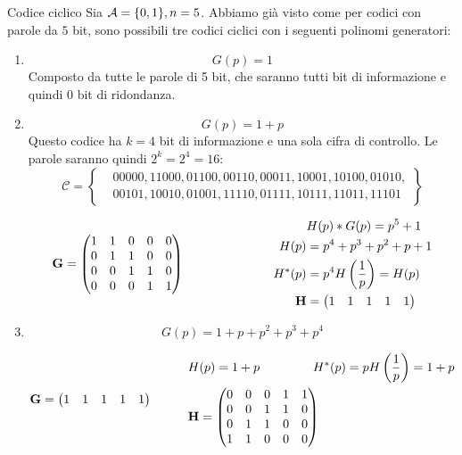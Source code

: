 \begin{esempio}{Codice ciclico}
    Sia $\mathcal{A}= \{0,1\}, \space n=5$. Abbiamo già visto come per codici con parole da $5$ bit, sono possibili tre codici ciclici con i seguenti polinomi generatori:
    \begin{enumerate}
        \item $$G(p)= 1$$
        Composto da tutte le parole di 5 bit, che saranno tutti bit di informazione e quindi $0$ bit di ridondanza.
        \item $$G(p)= 1 + p$$
        Questo codice ha $k=4$ bit di informazione e una sola cifra di controllo. Le parole saranno quindi $2^k=2^4=16$:
\[
\mathcal{C} = \left\{
\begin{aligned}
    &00000, 11000, 01100, 00110, 00011, 10001, 10100, 01010, \\
    &00101, 10010, 01001, 11110, 01111, 10111, 11011, 11101
\end{aligned}
\right\}
\]
\begin{center}

\renewcommand{\arraystretch}{1.2}
\[
\mathbf{G} = 
\begin{pmatrix}
1 & 1 & 0 & 0 & 0 \\
0 & 1 & 1 & 0 & 0 \\
0 & 0 & 1 & 1 & 0 \\
0 & 0 & 0 & 1 & 1
\end{pmatrix}
\hspace{2.5cm}
\begin{aligned}
&H(p)*G(p)= p^5 + 1\\
H(p) &= p^4 + p^3 + p^2 + p + 1 \\
H^*(p) &= p^4 H\left(\frac{1}{p}\right) = H(p) \\
\mathbf{H} &= \begin{pmatrix} 1 & 1 & 1 & 1 & 1 \end{pmatrix}
\end{aligned}
\]
\end{center}

\item $$G(p)=1 + p + p^2 + p^3 + p^4$$

\begin{center}
\renewcommand{\arraystretch}{1.2}
\[
\mathbf{G} = 
\begin{pmatrix}
1 & 1 & 1 & 1 & 1 
\end{pmatrix}
\hspace{1cm} %
\begin{aligned}
&H(p) = 1+p \hspace{1.5cm} H^*(p) = pH\left(\frac{1}{p}\right) = 1+p \\
&\mathbf{H} =
\begin{pmatrix}
0 & 0 & 0 & 1 & 1 \\
0 & 0 & 1 & 1 & 0 \\
0 & 1 & 1 & 0 & 0 \\
1 & 1 & 0 & 0 & 0
\end{pmatrix}
\end{aligned}
\]
\end{center}
\end{enumerate}
\end{esempio}

